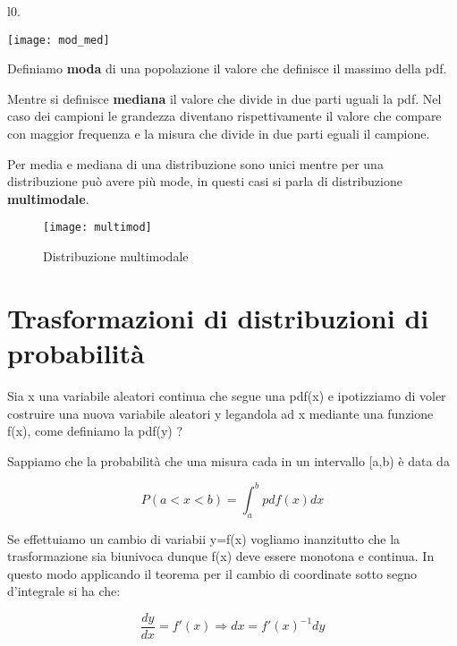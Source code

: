 \begin{wrapfigure}[8]{l}{0.\textwidth}

\centering

\texttt{[image: mod\_med]}	

\end{wrapfigure}


\noindent Definiamo \textbf{moda} di una popolazione il valore che definisce il massimo della pdf. \newline

\noindent Mentre si definisce \textbf{mediana} il valore che  divide in due parti uguali la pdf. Nel caso dei campioni le grandezza diventano rispettivamente il valore che compare con maggior frequenza e la misura che divide in due parti eguali il campione.

Per media e mediana di una distribuzione sono unici mentre per una distribuzione pu\`{o} avere pi\`{u} mode, in questi casi si parla di distribuzione \textbf{multimodale}.

 
\begin{figure}[ht]
\vspace{0.3in}
\texttt{[image: multimod]}	
\centering
\vspace{0.3in}
\caption{Distribuzione multimodale}
\end{figure}

\section{Trasformazioni di distribuzioni di probabilit\`{a}}

Sia x una variabile aleatori continua  che segue una pdf(x) e ipotizziamo di voler costruire una nuova variabile aleatori y legandola ad x mediante una funzione f(x), come definiamo la pdf(y) ?

Sappiamo che la probabilit\`{a} che una misura cada in un intervallo [a,b) \`{e} data da 

\begin{equation*}
	P(a < x< b) = \int_{a}^{b}{pdf(x)dx}
\end{equation*}
\newline

Se effettuiamo un cambio di variabii y=f(x) vogliamo inanzitutto che la trasformazione sia biunivoca dunque f(x) deve essere monotona e continua. In questo modo applicando il teorema per il cambio di coordinate sotto segno d'integrale si ha che:

\begin{equation}
	\dfrac{dy}{dx} = f'(x) \Rightarrow dx = f'(x)^{-1}dy
\end{equation}


